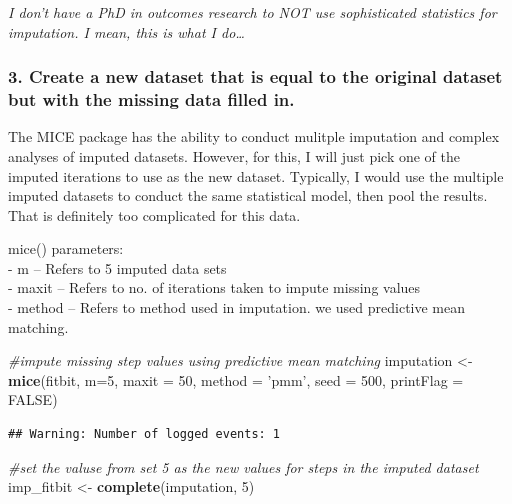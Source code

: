 \documentclass[]{article}
\newenvironment{Shaded}{\begin{snugshade}}{\end{snugshade}}
\newcommand{\KeywordTok}[1]{\textcolor[rgb]{0.13,0.29,0.53}{\textbf{#1}}}
\newcommand{\DataTypeTok}[1]{\textcolor[rgb]{0.13,0.29,0.53}{#1}}
\newcommand{\DecValTok}[1]{\textcolor[rgb]{0.00,0.00,0.81}{#1}}
\newcommand{\StringTok}[1]{\textcolor[rgb]{0.31,0.60,0.02}{#1}}
\newcommand{\CommentTok}[1]{\textcolor[rgb]{0.56,0.35,0.01}{\textit{#1}}}
\newcommand{\OtherTok}[1]{\textcolor[rgb]{0.56,0.35,0.01}{#1}}
\newcommand{\NormalTok}[1]{#1}
\begin{document}
\emph{I don't have a PhD in outcomes research to NOT use sophisticated
statistics for imputation. I mean, this is what I do\ldots{} }

\subsubsection{3. Create a new dataset that is equal to the original
dataset but with the missing data filled
in.}\label{create-a-new-dataset-that-is-equal-to-the-original-dataset-but-with-the-missing-data-filled-in.}

The MICE package has the ability to conduct mulitple imputation and
complex analyses of imputed datasets. However, for this, I will just
pick one of the imputed iterations to use as the new dataset. Typically,
I would use the multiple imputed datasets to conduct the same
statistical model, then pool the results. That is definitely too
complicated for this data.

mice() parameters:\\
- m -- Refers to 5 imputed data sets\\
- maxit -- Refers to no. of iterations taken to impute missing values\\
- method -- Refers to method used in imputation. we used predictive mean
matching.

\begin{Shaded}
\begin{Highlighting}[]
\CommentTok{#impute missing step values using predictive mean matching}
\NormalTok{imputation <-}\StringTok{ }\KeywordTok{mice}\NormalTok{(fitbit, }\DataTypeTok{m=}\DecValTok{5}\NormalTok{, }\DataTypeTok{maxit =} \DecValTok{50}\NormalTok{, }\DataTypeTok{method =} \StringTok{'pmm'}\NormalTok{, }\DataTypeTok{seed =} \DecValTok{500}\NormalTok{, }\DataTypeTok{printFlag =} \OtherTok{FALSE}\NormalTok{)}
\end{Highlighting}
\end{Shaded}

\begin{verbatim}
## Warning: Number of logged events: 1
\end{verbatim}

\begin{Shaded}
\begin{Highlighting}[]
\CommentTok{#set the valuse from set 5 as the new values for steps in the imputed dataset}
\NormalTok{imp_fitbit <-}\StringTok{ }\KeywordTok{complete}\NormalTok{(imputation, }\DecValTok{5}\NormalTok{)}
\end{Highlighting}
\end{Shaded}
\end{document}
